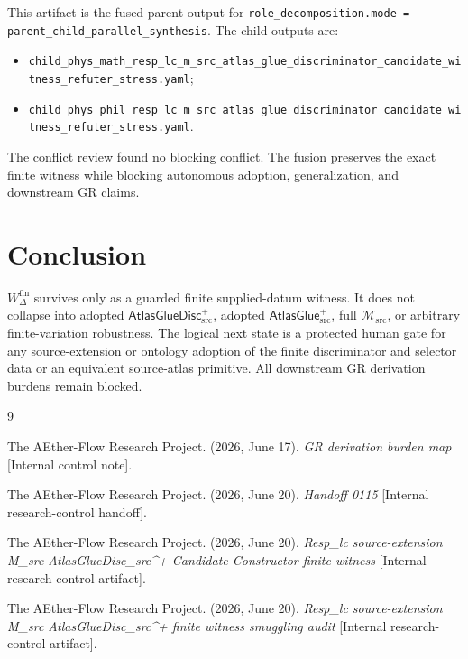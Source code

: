 \documentclass[11pt]{article}
\newcommand{\Msrc}{\mathcal{M}_{\mathrm{src}}}
\newcommand{\AtlasGlue}{\mathsf{AtlasGlue}_{\mathrm{src}}^{+}}
\newcommand{\AtlasGlueDisc}{\mathsf{AtlasGlueDisc}_{\mathrm{src}}^{+}}
\newcommand{\Wfin}{W_{\Delta}^{\mathrm{fin}}}
\begin{document}
This artifact is the fused parent output for
\texttt{role\_decomposition.mode = parent\_child\_parallel\_synthesis}. The
child outputs are:
\begin{itemize}
  \item \texttt{child\_phys\_math\_resp\_lc\_m\_src\_atlas\_glue\_discriminator\_candidate\_witness\_refuter\_stress.yaml};
  \item \texttt{child\_phys\_phil\_resp\_lc\_m\_src\_atlas\_glue\_discriminator\_candidate\_witness\_refuter\_stress.yaml}.
\end{itemize}
The conflict review found no blocking conflict. The fusion preserves the exact
finite witness while blocking autonomous adoption, generalization, and
downstream GR claims.

\section{Conclusion}

\(\Wfin\) survives only as a guarded finite supplied-datum witness. It does
not collapse into adopted \(\AtlasGlueDisc\), adopted \(\AtlasGlue\), full
\(\Msrc\), or arbitrary finite-variation robustness. The logical next state is
a protected human gate for any source-extension or ontology adoption of the
finite discriminator and selector data or an equivalent source-atlas primitive.
All downstream GR derivation burdens remain blocked.

\begin{thebibliography}{9}

The AEther-Flow Research Project. (2026, June 17). \emph{GR derivation burden
map} [Internal control note].

The AEther-Flow Research Project. (2026, June 20). \emph{Handoff 0115}
[Internal research-control handoff].

The AEther-Flow Research Project. (2026, June 20). \emph{Resp\_lc
source-extension M\_src AtlasGlueDisc\_src\^{}+ Candidate Constructor finite
witness} [Internal research-control artifact].

The AEther-Flow Research Project. (2026, June 20). \emph{Resp\_lc
source-extension M\_src AtlasGlueDisc\_src\^{}+ finite witness smuggling
audit} [Internal research-control artifact].

\end{thebibliography}
\end{document}
